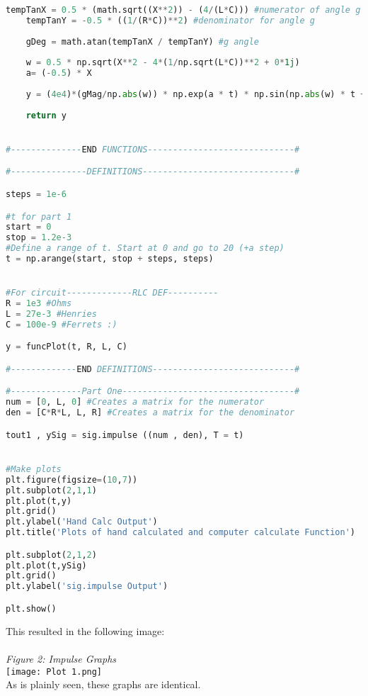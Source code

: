 \documentclass[12pt,a4paper]{article}
\begin{document}
\begin{lstlisting}[language=Python]
    tempTanX = 0.5 * (math.sqrt((X**2)) - (4/(L*C))) #numerator of angle g
    tempTanY = -0.5 * ((1/(R*C))**2) #denominator for angle g
    
    gDeg = math.atan(tempTanX / tempTanY) #g angle
    
    w = 0.5 * np.sqrt(X**2 - 4*(1/np.sqrt(L*C))**2 + 0*1j)
    a= (-0.5) * X
    
    y = (4e4)*(gMag/np.abs(w)) * np.exp(a * t) * np.sin(np.abs(w) * t + gDeg) * stepFunc(t, 0, 1)
    
    return y


#--------------END FUNCTIONS-----------------------------#

#---------------DEFINITIONS------------------------------#

steps = 1e-6

#t for part 1
start = 0
stop = 1.2e-3
#Define a range of t. Start at 0 and go to 20 (+a step)
t = np.arange(start, stop + steps, steps)


#For circuit-------------RLC DEF----------
R = 1e3 #Ohms
L = 27e-3 #Henries
C = 100e-9 #Ferrets :)

y = funcPlot(t, R, L, C)

#-------------END DEFINITIONS----------------------------#

#--------------Part One----------------------------------#
num = [0, L, 0] #Creates a matrix for the numerator
den = [C*R*L, L, R] #Creates a matrix for the denominator

tout1 , ySig = sig.impulse ((num , den), T = t)


#Make plots
plt.figure(figsize=(10,7))
plt.subplot(2,1,1)
plt.plot(t,y)
plt.grid()
plt.ylabel('Hand Calc Output')
plt.title('Plots of hand calculated and computer calculate Function')

plt.subplot(2,1,2)
plt.plot(t,ySig)
plt.grid()
plt.ylabel('sig.impulse Output')

plt.show()
\end{lstlisting}
This resulted in the following image:\\
\\
\textit{Figure 2: Impulse Graphs}
\\
\texttt{[image: Plot 1.png]}
\\
As is plainly seen, these graphs are identical.
\end{document}
